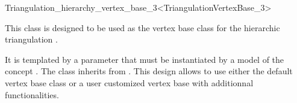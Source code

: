 

\begin{ccRefClass}{Triangulation_hierarchy_vertex_base_3<TriangulationVertexBase_3>}


\ccDefinition
  
This class is designed to be used as the vertex base class for the
hierarchic triangulation .

It is templated
by a parameter that must be instantiated by a model of  the concept
. The class
inherits from .  
This design allows to use either the default vertex base class or a
user customized vertex base with additionnal functionalities.



\ccInheritsFrom
{}

\ccTypes
{}

\ccSeeAlso
{}\\
\\

\end{ccRefClass}

